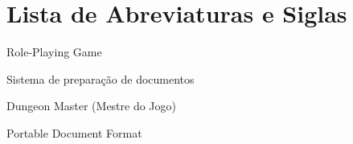 \cleardoublepage

\chapter*{Lista de Abreviaturas e Siglas}
\begin{description}[style=nextline, leftmargin=1cm]
    \item[RPG] Role-Playing Game
    \item[LaTeX] Sistema de preparação de documentos
    \item[DM] Dungeon Master (Mestre do Jogo)
    \item[PDF] Portable Document Format
\end{description}

\cleardoublepage

\tableofcontents


